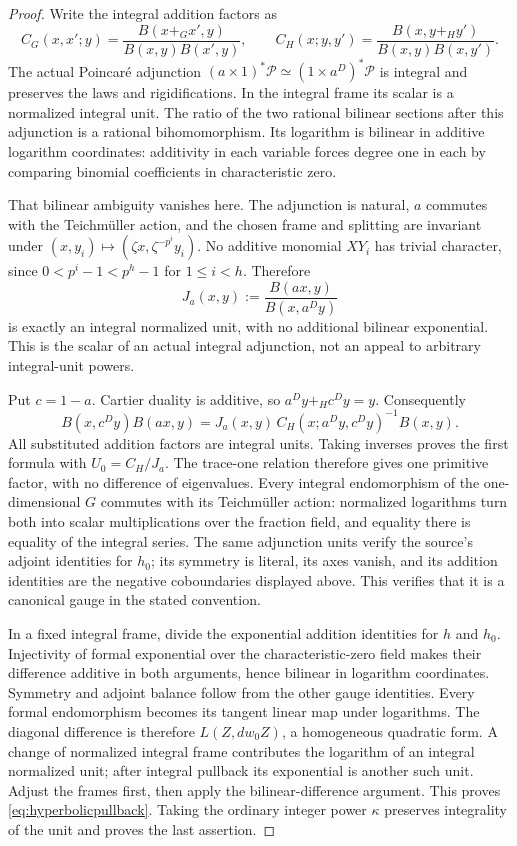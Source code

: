 \begin{proof}
Write the integral addition factors as
\[
 C_G(x,x';y)=\frac{B(x+_Gx',y)}{B(x,y)B(x',y)},\qquad
 C_H(x;y,y')=\frac{B(x,y+_Hy')}{B(x,y)B(x,y')}.
\]
The actual Poincar\'e adjunction
$(a\times1)^*\mathcal P\simeq(1\times a^D)^*\mathcal P$
is integral and preserves the laws and rigidifications. In the integral frame its scalar is a normalized integral unit.
The ratio of the two rational bilinear sections after this adjunction is a rational bihomomorphism. Its logarithm is bilinear in additive logarithm coordinates: additivity in each variable forces degree one in each by comparing binomial coefficients in characteristic zero.

That bilinear ambiguity vanishes here. The adjunction is natural, $a$ commutes with the Teichm\"uller action, and the chosen frame and splitting are invariant under
$(x,y_i)\mapsto(\zeta x,\zeta^{-p^i}y_i)$.
No additive monomial $XY_i$ has trivial character, since
$0<p^i-1<p^h-1$ for $1\le i<h$.
Therefore
\[
 J_a(x,y):=\frac{B(ax,y)}{B(x,a^Dy)}
\]
is exactly an integral normalized unit, with no additional bilinear exponential.
This is the scalar of an actual integral adjunction, not an appeal to arbitrary integral-unit powers.

Put $c=1-a$. Cartier duality is additive, so
$a^Dy+_Hc^Dy=y$. Consequently
\[
 B(x,c^Dy)B(ax,y)
 =J_a(x,y)\,C_H(x;a^Dy,c^Dy)^{-1}B(x,y).
\]
All substituted addition factors are integral units. Taking inverses proves the first formula with $U_0=C_H/J_a$.
The trace-one relation therefore gives one primitive factor, with no difference of eigenvalues.
Every integral endomorphism of the one-dimensional $G$ commutes with its Teichm\"uller action: normalized logarithms turn both into scalar multiplications over the fraction field, and equality there is equality of the integral series.
The same adjunction units verify the source's adjoint identities for $h_0$; its symmetry is literal, its axes vanish, and its addition identities are the negative coboundaries displayed above. This verifies that it is a canonical gauge in the stated convention.

In a fixed integral frame, divide the exponential addition identities for $h$ and $h_0$. Injectivity of formal exponential over the characteristic-zero field makes their difference additive in both arguments, hence bilinear in logarithm coordinates.
Symmetry and adjoint balance follow from the other gauge identities.
Every formal endomorphism becomes its tangent linear map under logarithms. The diagonal difference is therefore $L(Z,dw_0Z)$, a homogeneous quadratic form.
A change of normalized integral frame contributes the logarithm of an integral normalized unit; after integral pullback its exponential is another such unit. Adjust the frames first, then apply the bilinear-difference argument. This proves \eqref{eq:hyperbolicpullback}. Taking the ordinary integer power $\kappa$ preserves integrality of the unit and proves the last assertion.
\end{proof}

